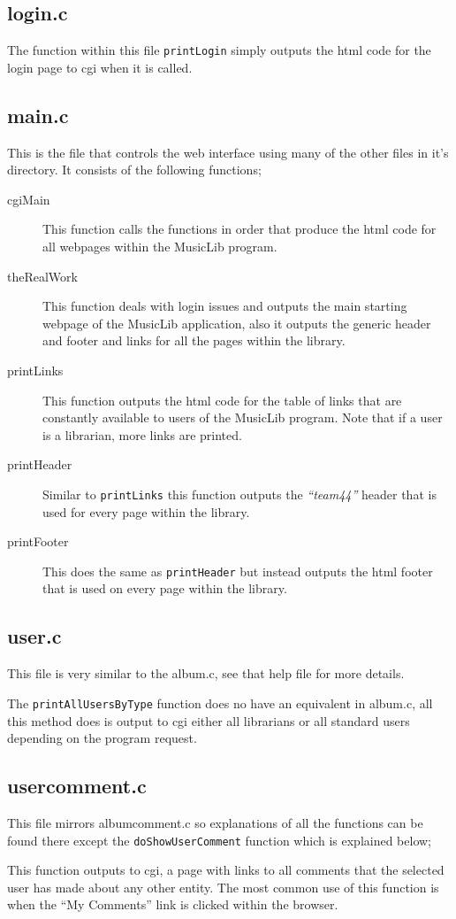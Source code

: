 \documentclass{article}
\begin{document}
\subsection{login.c}
The function within this file \verb|printLogin| simply outputs the html code for the login page to cgi when it is called.

\subsection{main.c}
This is the file that controls the web interface using many of the other files in it's directory. It consists of the following functions;
\begin{description}
\item[cgiMain] This function calls the functions in order that produce the html code for all webpages within the MusicLib program.
\item[theRealWork] This function deals with login issues and outputs the main starting webpage of the MusicLib application, also it outputs the generic header and footer and links for all the pages within the library.
\item[printLinks] This function outputs the html code for the table of links that are constantly available to users of the MusicLib program. Note that if a user is a librarian, more links are printed.
\item[printHeader] Similar to \verb|printLinks| this function outputs the \emph{``team44''} header that is used for every page within the library.
\item[printFooter] This does the same as \verb|printHeader| but instead outputs the html footer that is used on every page within the library.
\end{description}

\subsection{user.c}
This file is very similar to the album.c, see that help file for more details.

The \verb|printAllUsersByType| function does no have an equivalent in album.c, all this method does is output to cgi either all librarians or all standard users depending on the program request.
\subsection{usercomment.c}
This file mirrors albumcomment.c so explanations of all the functions can be found there except the \verb|doShowUserComment| function which is explained below;

This function outputs to cgi, a page with links to all comments that the selected user has made about any other entity. The most common use of this function is when the ``My Comments'' link is clicked within the browser.
\end{document}
